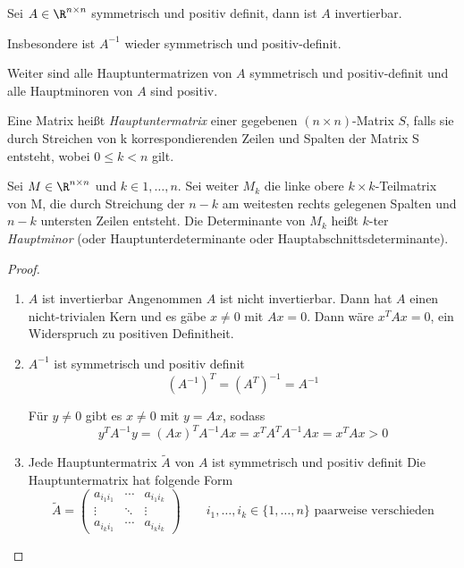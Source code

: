 \documentclass[a4paper]{scrartcl}
\numberwithin{equation}{section}
\begin{document}
\begin{st}
	\label{st:3.13}
	Sei $A\in \R^{n\times n}$ symmetrisch und positiv definit, dann ist $A$ invertierbar.
	
	Insbesondere ist $A^{-1}$ wieder symmetrisch und positiv-definit.

	Weiter sind alle Hauptuntermatrizen von $A$ symmetrisch und positiv-definit und alle Hauptminoren von $A$ sind positiv.
  \begin{note}
  Eine Matrix heißt \emph{Hauptuntermatrix} einer gegebenen $(n \times n)$-Matrix
$S$, falls sie durch Streichen von k korrespondierenden Zeilen und Spalten der Matrix S
entsteht, wobei $0 \le k < n$ gilt.

  Sei $M \in \R^{n\times n}$
und $k \in {1,\dotsc, n}$. Sei weiter $M_k$ die linke obere $k \times k$-Teilmatrix von M, die durch Streichung der $n - k$ am
weitesten rechts gelegenen Spalten und $n - k$ untersten Zeilen entsteht. Die Determinante von $M_k$ heißt $k$-ter
\emph{Hauptminor} (oder Hauptunterdeterminante oder Hauptabschnittsdeterminante).
  \end{note}
	\begin{proof}
		\begin{enumerate}
			\item \begin{seg}{$A$ ist invertierbar}
					Angenommen $A$ ist nicht invertierbar.
					Dann hat $A$ einen nicht-trivialen Kern und es gäbe $x\neq 0$ mit $Ax = 0$. 
					Dann wäre $x^TAx = 0$, ein Widerspruch zu positiven Definitheit.
				\end{seg}
			\item \begin{seg}{$A^{-1}$ ist symmetrisch und positiv definit}
					\[
						(A^{-1})^T = (A^T)^{-1} = A^{-1}
					\]
				
					Für $y\neq 0$ gibt es $x\neq 0$ mit $y=Ax$, sodass
					\[
						y^TA^{-1}y = (Ax)^TA^{-1}Ax = x^TA^TA^{-1}Ax = x^TAx > 0
					\]
				\end{seg}
			\item \begin{seg}{Jede Hauptuntermatrix $\tilde A$ von $A$ ist symmetrisch und positiv definit}
				Die Hauptuntermatrix hat folgende Form
				\[
					\tilde A = \begin{pmatrix} a_{i_1i_1} & \cdots & a_{i_1i_k}\\ \vdots &\ddots & \vdots \\ a_{i_ki_1} &\cdots & a_{i_ki_k}\end{pmatrix} \qquad i_1,\dotsc,i_k \in \{1,\dotsc,n\} \text{ paarweise verschieden}
				\]
				

\end{seg}
\end{enumerate}
\end{proof}
\end{st}
\end{document}
